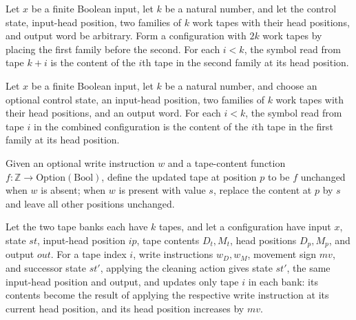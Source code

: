 \begin{lemma}
\label{Complexity.LogProg.ccfg_mark}
\leanok
{}
Let $x$ be a finite Boolean input, let $k$ be a natural number, and let the control
state, input-head position, two families of $k$ work tapes with their head positions,
and output word be arbitrary. Form a configuration with $2k$ work tapes by placing the
first family before the second. For each $i<k$, the symbol read from tape $k+i$ is the
content of the $i$th tape in the second family at its head position.
\end{lemma}

\begin{lemma}
\label{Complexity.LogProg.ccfg_work}
\leanok
{}
Let $x$ be a finite Boolean input, let $k$ be a natural number, and choose an optional
control state, an input-head position, two families of $k$ work tapes with their head
positions, and an output word. For each $i<k$, the symbol read from tape $i$ in the
combined configuration is the content of the $i$th tape in the first family at its head
position.
\end{lemma}

\begin{definition}
\label{Complexity.LogProg.wr}
\leanok
Given an optional write instruction $w$ and a tape-content function $f:\mathbb
Z\to\mathrm{Option}(\mathrm{Bool})$, define the updated tape at position $p$ to be $f$
unchanged when $w$ is absent; when $w$ is present with value $s$, replace the content at
$p$ by $s$ and leave all other positions unchanged.
\end{definition}

\begin{lemma}
\label{Complexity.LogProg.apply_clAct}
\leanok
{}
Let the two tape banks each have $k$ tapes, and let a configuration have input $x$,
state $st$, input-head position $ip$, tape contents $D_t,M_t$, head positions $D_p,M_p$,
and output $out$. For a tape index $i$, write instructions $w_D,w_M$, movement sign
$mv$, and successor state $st'$, applying the cleaning action gives state $st'$, the
same input-head position and output, and updates only tape $i$ in each bank: its
contents become the result of applying the respective write instruction at its current
head position, and its head position increases by $mv$.
\end{lemma}

